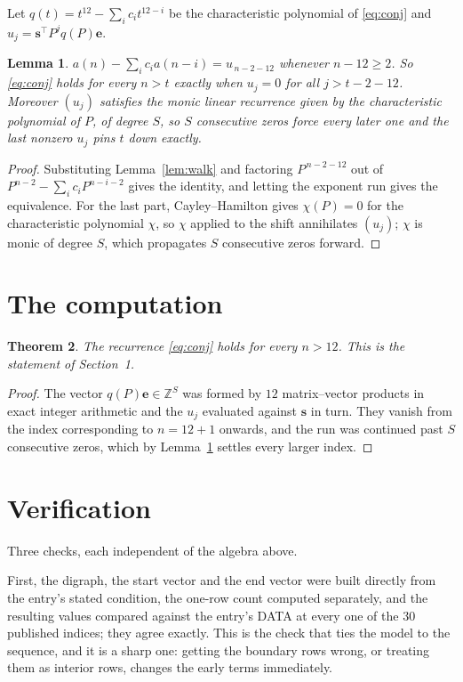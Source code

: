 \documentclass[11pt,a4paper]{article}
\theoremstyle{plain}
\newtheorem{theorem}{Theorem}
\newtheorem{lemma}[theorem]{Lemma}
\theoremstyle{definition}
\begin{document}
Let $q(t)=t^{12}-\sum_i c_i t^{12-i}$ be the characteristic polynomial of
\eqref{eq:conj} and $u_j=\mathbf{s}^{\!\top}P^{j}q(P)\mathbf{e}$.

\begin{lemma}\label{lem:crit}
$a(n)-\sum_i c_i a(n-i)=u_{\,n-2-12}$ whenever $n-12\ge2$. So \eqref{eq:conj}
holds for every $n>t$ exactly when $u_j=0$ for all $j>t-2-12$. Moreover $(u_j)$
satisfies the monic linear recurrence given by the characteristic polynomial of $P$, of
degree $S$, so $S$ consecutive zeros force every later one and the last nonzero $u_j$ pins
$t$ down exactly.
\end{lemma}

\begin{proof}
Substituting Lemma~\ref{lem:walk} and factoring $P^{\,n-2-12}$ out of
$P^{n-2}-\sum_i c_i P^{n-i-2}$ gives the identity, and letting the exponent run gives the
equivalence. For the last part, Cayley--Hamilton gives $\chi(P)=0$ for the characteristic
polynomial $\chi$, so $\chi$ applied to the shift annihilates $(u_j)$; $\chi$ is monic of
degree $S$, which propagates $S$ consecutive zeros forward.
\end{proof}

\section{The computation}

\begin{theorem}
The recurrence \eqref{eq:conj} holds for every $n>12$. This is the statement of
Section~1.
\end{theorem}

\begin{proof}
The vector $q(P)\mathbf{e}\in\mathbb{Z}^{S}$ was formed by $12$ matrix--vector
products in exact integer arithmetic and the $u_j$ evaluated against $\mathbf{s}$ in turn.
They vanish from the index corresponding to $n=12+1$ onwards, and the run was continued
past $S$ consecutive zeros, which by Lemma~\ref{lem:crit} settles every larger index.
\end{proof}

\section{Verification}

Three checks, each independent of the algebra above.

First, the digraph, the start vector and the end vector were built directly from the
entry's stated condition, the one-row count computed separately, and the resulting values
compared against the entry's DATA at every one of the $30$ published indices; they
agree exactly. This is the check that ties the model to the sequence, and it is a sharp one:
getting the boundary rows wrong, or treating them as interior rows, changes the early terms
immediately.
\end{document}
